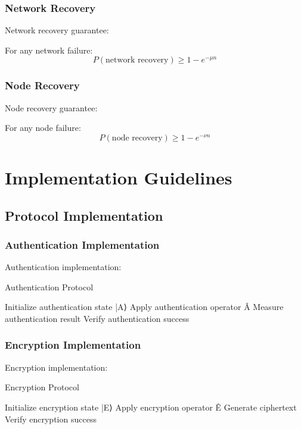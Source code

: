 \documentclass[12pt]{article}
\begin{document}
\subsubsection{Network Recovery}
Network recovery guarantee:
\begin{theorem}
For any network failure:
\begin{equation}
P(\text{network recovery}) \geq 1 - e^{-\mu n}
\end{equation}
\end{theorem}
\subsubsection{Node Recovery}
Node recovery guarantee:
\begin{theorem}
For any node failure:
\begin{equation}
P(\text{node recovery}) \geq 1 - e^{-\nu n}
\end{equation}
\end{theorem}
\section{Implementation Guidelines}
\subsection{Protocol Implementation}
\subsubsection{Authentication Implementation}
Authentication implementation:
\begin{algorithm}
\caption{Authentication Protocol}
\begin{algorithmic}
\STATE Initialize authentication state |A⟩
\STATE Apply authentication operator Â
\STATE Measure authentication result
\STATE Verify authentication success
\end{algorithmic}
\end{algorithm}
\subsubsection{Encryption Implementation}
Encryption implementation:
\begin{algorithm}
\caption{Encryption Protocol}
\begin{algorithmic}
\STATE Initialize encryption state |E⟩
\STATE Apply encryption operator Ê
\STATE Generate ciphertext
\STATE Verify encryption success
\end{algorithmic}
\end{algorithm}
\end{document}
